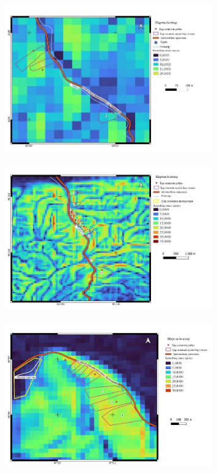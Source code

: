 \begin{figure}[H]
	\centering
	\includegraphics[width=0.8\textwidth]{media/ict2/image221}
	\caption*{}
\end{figure}

\begin{figure}[H]
	\centering
	\includegraphics[width=0.8\textwidth]{media/ict2/image222}
	\caption*{}
\end{figure}

\begin{figure}[H]
	\centering
	\includegraphics[width=0.8\textwidth]{media/ict2/image223}
	\caption*{}
\end{figure}

